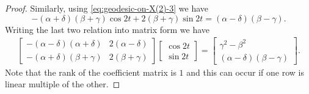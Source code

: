 \begin{proof}
	Similarly, using \eqref{eq:geodesic-on-X(2)-3} we have 
	\begin{equation*}
		 -(\alpha+\delta)(\beta+\gamma)\cos 2t+2(\beta+\gamma)\sin 2t = (\alpha-\delta)(\beta-\gamma) \label{eq:sin-cosine-rel-2}.
	\end{equation*}
	Writing the last two relation into matrix form we have 
	\begin{align}
		\begin{bmatrix}
		-(\alpha-\delta)(\alpha+\delta) & 2(\alpha-\delta) \\ 
		-(\alpha+\delta)(\beta+\gamma) & 2(\beta+\gamma)
		\end{bmatrix}
		\begin{bmatrix}
		\cos 2t \\ \sin 2t
		\end{bmatrix}
		= 
		\begin{bmatrix}
			\gamma^2-\beta^2 \\ (\alpha-\delta)(\beta-\gamma)
		\end{bmatrix}. \label{eq:system-of-eq}
	\end{align}
	Note that the rank of the coefficient matrix is $1$ and this can occur if one row is linear multiple of the other. 


\end{proof}
